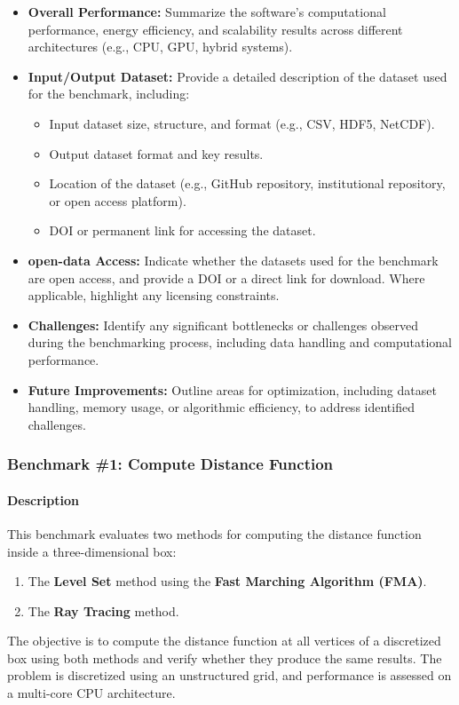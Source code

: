 \begin{itemize}
    \item \textbf{Overall Performance:} Summarize the software's computational performance, energy efficiency, and scalability results across different architectures (e.g., CPU, GPU, hybrid systems).
    \item \textbf{Input/Output Dataset:} Provide a detailed description of the dataset used for the benchmark, including:
        \begin{itemize}
            \item Input dataset size, structure, and format (e.g., CSV, HDF5, NetCDF).
            \item Output dataset format and key results.
            \item Location of the dataset (e.g., GitHub repository, institutional repository, or open access platform).
            \item DOI or permanent link for accessing the dataset.
        \end{itemize}
    \item \textbf{open-data Access:} Indicate whether the datasets used for the benchmark are open access, and provide a DOI or a direct link for download. Where applicable, highlight any licensing constraints.
    \item \textbf{Challenges:} Identify any significant bottlenecks or challenges observed during the benchmarking process, including data handling and computational performance.
    \item \textbf{Future Improvements:} Outline areas for optimization, including dataset handling, memory usage, or algorithmic efficiency, to address identified challenges.
\end{itemize}

\subsubsection{Benchmark \#1: Compute Distance Function}

\paragraph{Description}
This benchmark evaluates two methods for computing the distance function inside a three-dimensional box:
\begin{enumerate}
    \item The \textbf{Level Set} method using the \textbf{Fast Marching Algorithm (FMA)}.
    \item The \textbf{Ray Tracing} method.
\end{enumerate}
The objective is to compute the distance function at all vertices of a discretized box using both methods and verify whether they produce the same results.
The problem is discretized using an unstructured grid, and performance is assessed on a multi-core CPU architecture.

